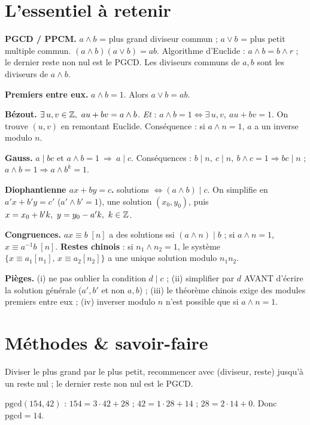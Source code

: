 \section{L'essentiel à retenir}

\begin{synthese}
\textbf{PGCD / PPCM.}\;
$a\wedge b$ = plus grand diviseur commun ; $a\vee b$ = plus petit multiple commun.
$(a\wedge b)(a\vee b)=ab$. Algorithme d'Euclide : $a\wedge b=b\wedge r$ ; le dernier reste
non nul est le PGCD. Les diviseurs communs de $a,b$ sont les diviseurs de $a\wedge b$.

\smallskip
\textbf{Premiers entre eux.}\; $a\wedge b=1$. Alors $a\vee b=ab$.

\smallskip
\textbf{Bézout.}\; $\exists\,u,v\in\mathbb{Z},\ au+bv=a\wedge b$. \emph{Et} :
$a\wedge b=1\iff\exists\,u,v,\ au+bv=1$. On trouve $(u,v)$ en remontant Euclide.
Conséquence : si $a\wedge n=1$, $a$ a un inverse modulo $n$.

\smallskip
\textbf{Gauss.}\; $a\mid bc$ et $a\wedge b=1\ \Rightarrow\ a\mid c$. Conséquences :
$b\mid n,\ c\mid n,\ b\wedge c=1\Rightarrow bc\mid n$ ; $a\wedge b=1\Rightarrow a\wedge b^k=1$.

\smallskip
\textbf{Diophantienne $ax+by=c$.}\; solutions $\iff (a\wedge b)\mid c$. On simplifie en
$a'x+b'y=c'$ ($a'\wedge b'=1$), une solution $(x_0,y_0)$, puis
$x=x_0+b'k,\ y=y_0-a'k,\ k\in\Z$.

\smallskip
\textbf{Congruences.}\; $ax\equiv b\;[n]$ a des solutions ssi $(a\wedge n)\mid b$ ; si
$a\wedge n=1$, $x\equiv a^{-1}b\;[n]$. \textbf{Restes chinois} : si $n_1\wedge n_2=1$, le
système $\{x\equiv a_1[n_1],\,x\equiv a_2[n_2]\}$ a une unique solution modulo $n_1n_2$.

\smallskip
\textbf{Pièges.}\; (i) ne pas oublier la condition $d\mid c$ ; (ii) simplifier par $d$ AVANT
d'écrire la solution générale ($a',b'$ et non $a,b$) ; (iii) le théorème chinois exige des
modules premiers entre eux ; (iv) inverser modulo $n$ n'est possible que si $a\wedge n=1$.
\end{synthese}

\section{Méthodes \& savoir-faire}

Diviser le plus grand par le plus petit, recommencer avec (diviseur, reste) jusqu'à un reste
nul ; le dernier reste non nul est le PGCD.
\begin{exemple}
$\mathrm{pgcd}(154,42)$ : $154=3\cdot42+28$ ; $42=1\cdot28+14$ ; $28=2\cdot14+0$. Donc
$\mathrm{pgcd}=14$.
\end{exemple}


